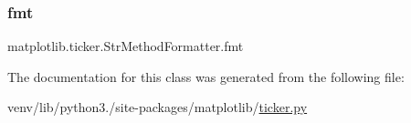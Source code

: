 \subsubsection{\texorpdfstring{fmt}{fmt}}
{\footnotesize\ttfamily matplotlib.\+ticker.\+Str\+Method\+Formatter.\+fmt}



The documentation for this class was generated from the following file\+:\begin{DoxyCompactItemize}
\item 
venv/lib/python3./site-\/packages/matplotlib/\hyperlink{ticker_8py}{ticker.\+py}\end{DoxyCompactItemize}
